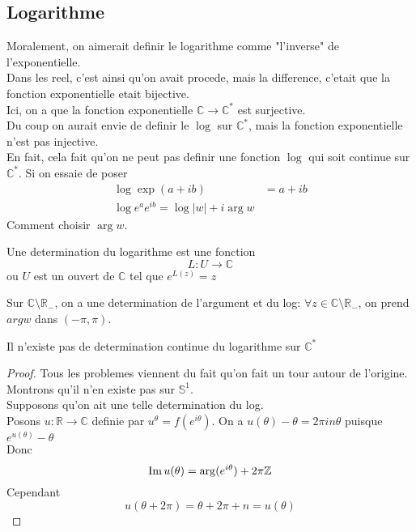 \documentclass[../main.tex]{subfiles}
\begin{document}
\subsection{Logarithme}
Moralement, on aimerait definir le logarithme comme "l'inverse" de l'exponentielle.\\
Dans les reel, c'est ainsi qu'on avait procede, mais la difference, c'etait que la fonction exponentielle etait bijective.\\
Ici, on a que la fonction exponentielle $ \mathbb{C}\to \mathbb{C}^{*}$ est surjective.\\
Du coup on aurait envie de definir le $\log$ sur $\mathbb{C}^{*}$, mais la fonction exponentielle n'est pas injective.\\
En fait, cela fait qu'on ne peut pas definir une fonction $\log$ qui soit continue sur $\mathbb{C}^{*}$. Si on essaie de poser
\begin{align*}
	\log \exp ( a+ib) &= a+ib\\
	\log e^{a}  e^{ib} = \log |w| + i \arg w
\end{align*}
Comment choisir $\arg w$.\\
\begin{defn}
Une determination du logarithme est une fonction
\[ 
L:U \to \mathbb{C}
\]
ou $U$ est un ouvert de $\mathbb{C}$ tel que $ e^{L( z) } =z$ 
\end{defn}
\begin{rmq}
	Sur $ \mathbb{C}\setminus \mathbb{R}_-$, on a une determination de l'argument et du log: $\forall z \in \mathbb{C}\setminus \mathbb{R}_-$, on prend $arg w$ dans $ ( -\pi, \pi) $.
\end{rmq}
			
\begin{propo}
Il n'existe pas de determination continue du logarithme sur $ \mathbb{C}^{*}$ 
\end{propo}
\begin{proof}
Tous les problemes viennent du fait qu'on fait un tour autour de l'origine.\\
Montrons qu'il n'en existe pas sur $ \mathbb{S}^{1}$.\\
Supposons qu'on ait une telle determination du log.\\
Posons $u : \mathbb{R}\to \mathbb{C}$ definie par $u^{\theta}= f( e^{i\theta} ) $. On a $u ( \theta) -\theta = 2\pi in \theta$ puisque $ e^{u( \theta) } - \theta$ \\
Donc
\[ 
	\operatorname{Im} u ( \theta) = \arg ( e^{i\theta}) + 2 \pi \mathbb{Z}
\]
Cependant
\[ 
	u( \theta + 2 \pi ) = \theta + 2 \pi + n  =u( \theta) 
\]
	

\end{proof}
\end{document}
